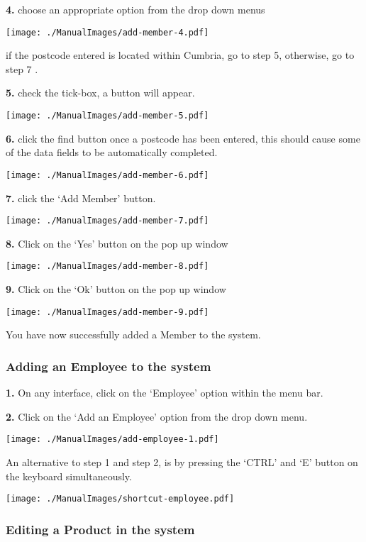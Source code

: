 \textbf{4.} choose an appropriate option from the drop down menus

\texttt{[image: ./ManualImages/add-member-4.pdf]}

if the postcode entered is located within Cumbria, go to step 5, otherwise, go to step 7 .

\textbf{5.} check the tick-box, a button will appear.

\texttt{[image: ./ManualImages/add-member-5.pdf]}

\textbf{6.} click the find button once a postcode has been entered, this should cause some of the data fields to be automatically completed.

\texttt{[image: ./ManualImages/add-member-6.pdf]}

\textbf{7.} click the `Add Member' button.

\texttt{[image: ./ManualImages/add-member-7.pdf]}

\textbf{8.} Click on the `Yes' button on the pop up window

\texttt{[image: ./ManualImages/add-member-8.pdf]}

\textbf{9.} Click on the `Ok' button on the pop up window

\texttt{[image: ./ManualImages/add-member-9.pdf]}

You have now successfully added a Member to the system.

\pagebreak
\subsubsection{Adding an Employee to the system}
\label{fig:Adding an Employee to the system}

\textbf{1.} On any interface, click on the `Employee' option within the menu bar.

\textbf{2.} Click on the `Add an Employee' option from the drop down menu.

\texttt{[image: ./ManualImages/add-employee-1.pdf]}

An alternative to step 1 and step 2, is by pressing the `CTRL' and `E' button on the keyboard simultaneously.

\texttt{[image: ./ManualImages/shortcut-employee.pdf]}

\pagebreak
\subsubsection{Editing a Product in the system}
\label{fig:Editing a Product in the system}

